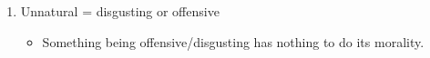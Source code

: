 \documentclass{article}
\begin{document}
\begin{spacing}{1.2}
\begin{itemize}
\begin{enumerate}
\begin{itemize}
                        \end{itemize}
                  \item Unnatural = disgusting or offensive
                        \begin{itemize}
                            \item Something being offensive/disgusting has nothing to do its morality.
                        \end{itemize}
              \end{enumerate}
    \end{itemize}
\end{spacing}
\end{document}
